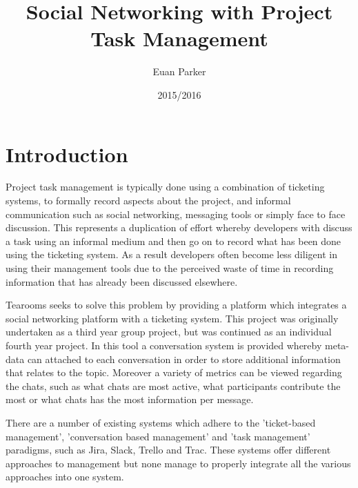 \documentclass{l4proj}
\begin{document}
\title{Social Networking with Project Task Management}
\author{Euan Parker}
\date{2015/2016}
\maketitle

\begin{abstract}

\end{abstract}

\educationalconsent
%
%
\tableofcontents

\chapter{Introduction}


Project task management is typically done using a combination of ticketing systems, to formally record aspects about the project, and informal communication such as social networking, messaging tools or simply face to face discussion. This represents a duplication of effort whereby developers with discuss a task using an informal medium and then go on to record what has been done using the ticketing system.  As a result developers often become less diligent in using their management tools due to the perceived waste of time in recording information that has already been discussed elsewhere. 

Tearooms seeks to solve this problem by providing a platform which integrates a social networking platform with a ticketing system. This project was originally undertaken as a third year group project, but was continued as an individual fourth year project.  In this tool a conversation system is provided whereby meta-data can attached to each conversation in order to store additional information that relates to the topic.  Moreover a variety of metrics can be viewed regarding the chats, such as what chats are most active, what participants contribute the most or what chats has the most information per message.

There are a number of existing systems which adhere to the 'ticket-based management', 'conversation based management' and 'task management' paradigms, such as Jira, Slack, Trello and Trac.  These systems offer different approaches to management but none manage to properly integrate all the various approaches into one system.
\end{document}

